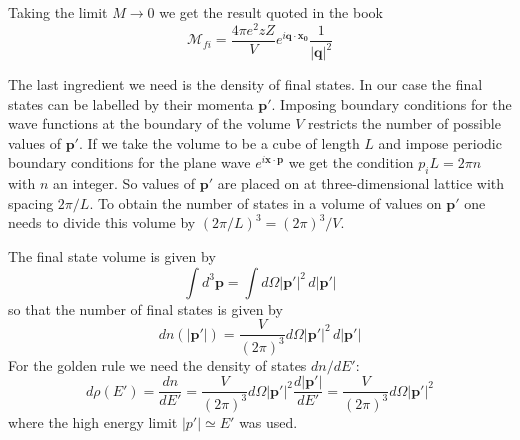 \documentclass[12pt]{article}
\newcommand{\V}[1]{\mathbf{#1}}
\begin{document}
Taking the limit $M\rightarrow 0$ we get the result quoted in the book
\[\mathcal{M}_{fi}= \frac{4\pi e^2zZ}{V}e^{i\V{q}\cdot \V{x_0}}  \frac{1}{|\V{q}|^2} \]

The last ingredient we need is the density of final states. In our case the final states can be labelled by their momenta $\V{p}'$. Imposing boundary conditions for the wave functions at the boundary of the volume $V$ restricts the number of possible values of $\V{p}'$. If we take the volume to be a cube of length $L$ and impose periodic boundary conditions for the plane wave $e^{i\V{x}\cdot\V{p}}$ we get the condition $p_i L=2\pi n$ with $n$ an integer. So values of $\V{p}'$ are placed on at three-dimensional lattice with spacing $2\pi/L$. To obtain the number of states in a volume of values on $\V{p'}$ one needs to divide this volume by $(2\pi/L)^3=(2\pi)^3/V$. 

The final state volume is given by
\[\int d^3\V{p}=\int d\Omega |\V{p'}|^2\,d|\V{p'}|\] 
so that the number of final states is given by
\[ dn(|\V{p'}|)=\frac{V}{(2\pi)^3} d\Omega |\V{p'}|^2\,d|\V{p'}|\]
For the golden rule we need the density of states $dn/dE'$:
\begin{equation}\label{eq:Edensity}
d\rho(E')=\frac{dn}{dE'}=\frac{V}{(2\pi)^3} d\Omega |\V{p'}|^2\frac{d|\V{p'}|}{dE'}= \frac{V}{(2\pi)^3} d\Omega |\V{p'}|^2 
\end{equation}
where the high energy limit $|p'|\simeq E'$ was used.
\end{document}
